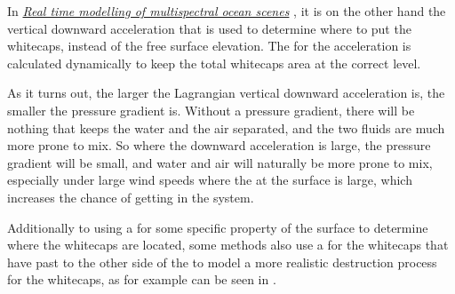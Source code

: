In \textit{\href{http://web1.see.asso.fr/ocoss2010/Session_4/20100531111216_Monnier_OCOSS2010-Paper_MERCUDA_item_2.pdf}{Real time modelling of multispectral ocean scenes}} \citep{temp}, it is on the other hand the vertical downward acceleration that is used to determine where to put the whitecaps, instead of the free surface elevation. The \threshold for the acceleration is calculated dynamically to keep the total whitecaps area at the correct level. 

As it turns out, the larger the Lagrangian vertical downward acceleration is, the smaller the pressure gradient is. Without a pressure gradient, there will be nothing that keeps the water and the air separated, and the two fluids are much more prone to mix. So where the downward acceleration is large, the pressure gradient will be small, and water and air will naturally be more prone to mix, especially under large wind speeds where the  at the surface is large, which increases the chance of getting  in the system.

Additionally to using a \threshold for some specific property of the surface to determine where the whitecaps are located, some methods also use a  for the whitecaps that have past to the other side of the \threshold to model a more realistic destruction process for the whitecaps, as for example can be seen in \citep{ozernik2009,cebasVT2010}.

